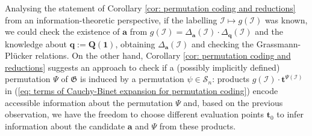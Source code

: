 \documentclass[10pt]{article}
\theoremstyle{remark}%
\theoremstyle{definition}%
\begin{document}
Analysing the statement of Corollary \ref{cor: permutation coding and reductions} from an information-theoretic perspective, if the labelling $\mathcal{I}\mapsto g(\mathcal{I})$ was known, we could check the existence of $\mathbf{a}$
from $g(\mathcal{I})=\Delta_{\mathbf{a}}(\mathcal{I})\cdot\Delta_{\mathbf{q}}(\mathcal{I})$ and the knowledge about $\mathbf{q}:=\mathbf{Q}(\mathbf{1})$, obtaining $\Delta_{\mathbf{a}}(\mathcal{I})$ and checking the Grassmann-Pl\"{u}cker relations. On the other hand, Corollary \ref{cor: permutation coding and reductions} suggests an approach to check if a (possibly implicitly defined) permutation $\Psi$ of $\mathfrak{G}$ is induced by a permutation $\psi\in\mathcal{S}_{n}$: products $g(\mathcal{I})\cdot\mathbf{t}^{\Psi(\mathcal{I})}$ in (\ref{eq: terms of Cauchy-Binet expansion for permutation coding}) encode accessible information about the permutation $\Psi$ and, based on the previous observation, we have the freedom to choose different evaluation points $\mathbf{t}_{0}$ to infer information about the candidate $\mathbf{a}$ and $\Psi$ from these products. 
\end{document}
